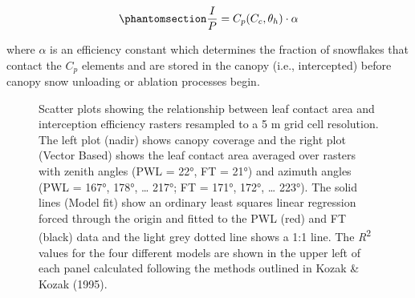 \documentclass[
  letterpaper,
  DIV=11,
  numbers=noendperiod]{scrartcl}
\begin{document}
\begin{equation}\phantomsection\label{eq-lca-ip}{
  \frac{I}{P} = C_p(C_c, \theta_h) \cdot \alpha
}\end{equation}

where \(\alpha\) is an efficiency constant which determines the fraction
of snowflakes that contact the \(C_p\) elements and are stored in the
canopy (i.e., intercepted) before canopy snow unloading or ablation
processes begin.

\begin{figure}[H]


\caption{\label{fig-lca-vs-ip}Scatter plots showing the relationship
between leaf contact area and interception efficiency rasters resampled
to a 5 m grid cell resolution. The left plot (nadir) shows canopy
coverage and the right plot (Vector Based) shows the leaf contact area
averaged over rasters with zenith angles (PWL = 22°, FT = 21°) and
azimuth angles (PWL = 167°, 178°, \ldots{} 217°; FT = 171°, 172°,
\ldots{} 223°). The solid lines (Model fit) show an ordinary least
squares linear regression forced through the origin and fitted to the
PWL (red) and FT (black) data and the light grey dotted line shows a 1:1
line. The \emph{R}\textsuperscript{2} values for the four different
models are shown in the upper left of each panel calculated following
the methods outlined in Kozak \& Kozak (1995).}

\end{figure}%
\end{document}
